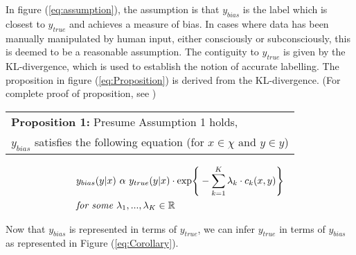 \bigskip
In figure (\ref{eq:assumption}), the assumption is that $y_{bias}$ is the label which is closest to $y_{true}$ and achieves a measure of bias.
In cases where data has been manually manipulated by human input, either consciously or subconsciously, this is deemed to be a reasonable assumption.
The contiguity to $y_{true}$ is given by the KL-divergence, which is used to establish the notion of accurate labelling. 
The proposition in figure (\ref{eq:Proposition}) is derived from the KL-divergence. (For complete proof of proposition, see \cite{Jiang})
\enlargethispage{-2\baselineskip}

\bigskip
\begin{center}
    \begin{tabular}{l}
        \textbf{Proposition 1: } Presume Assumption 1 holds, \\
        $y_{bias}$ satisfies the following equation (for $x \in \chi \text{ and } y \in y$) \\
    \end{tabular}

    \begin{equation}
        \label{eq:Proposition}
        \begin{split}
            & y_{bias}(y|x) \text{ }\alpha \text{ } y_{true}(y|x) \cdot \text{exp} \Bigg\{ -\sum^K_{k=1} \lambda_k \cdot c_k(x,y)\Bigg\} \\
            & \textit{for some } \lambda_1, ..., \lambda_K \in \mathbb{R}
        \end{split}
    \end{equation}
\end{center}

\bigskip
Now that $y_{bias}$ is represented in terms of $y_{true}$, we can infer $y_{true}$ in terms of $y_{bias}$ as represented in Figure (\ref{eq:Corollary}).



